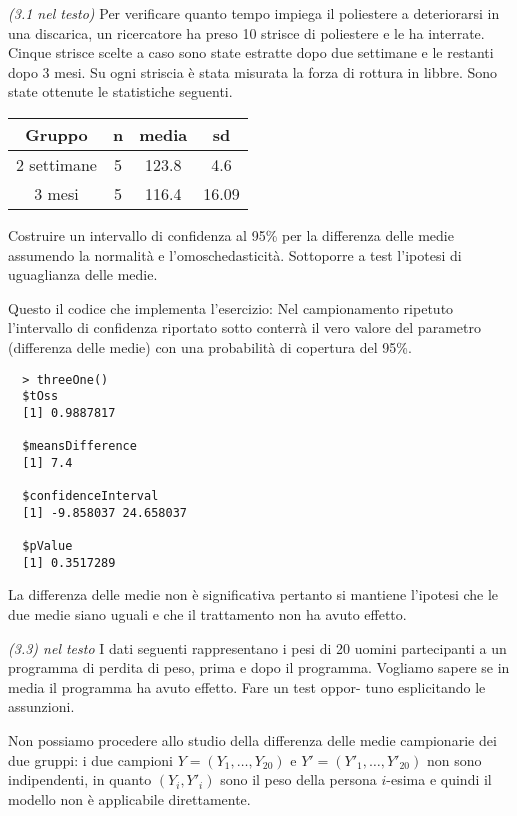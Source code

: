 \begin{exercise}{\emph{(3.1 nel testo)}}
  Per verificare quanto tempo impiega il poliestere a deteriorarsi in
  una discarica, un ricercatore ha preso 10 strisce di poliestere e le
  ha interrate. Cinque strisce scelte a caso sono state estratte dopo
  due settimane e le restanti dopo 3 mesi. Su ogni striscia \`e stata
  misurata la forza di rottura in libbre. Sono state ottenute le
  statistiche seguenti.
  \begin{table}[h]              %
    \centering
    \begin{tabular}{|c|c|c|c|}
      \hline
      Gruppo & n & media & sd \\\hline
      2 settimane & 5 & 123.8 & 4.6 \\
      3 mesi & 5 & 116.4 & 16.09 \\ \hline
    \end{tabular}
  \end{table}
  Costruire un intervallo di confidenza al 95\% per la differenza
  delle medie assumendo la normalit\`a e l'omoschedasticit\`a.
  Sottoporre a test l'ipotesi di uguaglianza delle medie.
\end{exercise}
Questo il codice che implementa l'esercizio:
 Nel
campionamento ripetuto l'intervallo di confidenza riportato sotto
conterr\`a il vero valore del parametro (differenza delle medie) con una
probabilit\`a di copertura del 95\%.
\begin{lstlisting}
  > threeOne()
  $tOss
  [1] 0.9887817

  $meansDifference
  [1] 7.4

  $confidenceInterval
  [1] -9.858037 24.658037

  $pValue
  [1] 0.3517289
\end{lstlisting}
La differenza delle medie non \`e significativa pertanto si mantiene
l'ipotesi che le due medie siano uguali e che il trattamento non ha
avuto effetto.

\begin{exercise}{\emph{(3.3) nel testo}}
  I dati seguenti rappresentano i pesi di 20 uomini partecipanti a un
  programma di perdita di peso, prima e dopo il programma.  Vogliamo
  sapere se in media il programma ha avuto effetto. Fare un test
  oppor- tuno esplicitando le assunzioni.
\end{exercise}
Non possiamo procedere allo studio della differenza delle medie
campionarie dei due gruppi: i due campioni $Y=(Y_1, \ldots, Y_{20})$ e
$Y' = (Y'_1, \ldots, Y'_{20})$ non sono indipendenti, in quanto $(Y_i,
Y'_i)$ sono il peso della persona $i$-esima e quindi il modello non
\`e applicabile direttamente.

